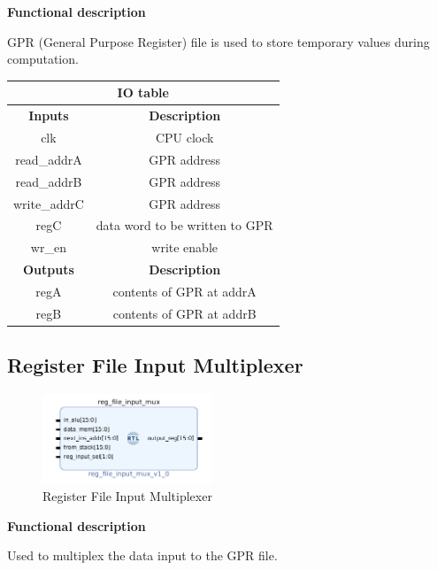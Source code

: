 \documentclass{article}
\begin{document}
\begin{par}
	\textbf{Functional description}
	\begin{par}
		GPR (General Purpose Register) file is used to store temporary values during computation.
	\end{par} 
	
	\begin{center}
		\begin{tabular}{|c|c|}
			\hline 
			\multicolumn{2}{|c|}{\textbf{IO table}} \\
			\hline 
			\textbf{Inputs} & \textbf{Description} \\ 
			\hline 
			clk & CPU clock \\ 
			\hline 
			read\_addrA & GPR address \\ 
			\hline 
			read\_addrB & GPR address \\ 
			\hline 
			write\_addrC & GPR address \\ 
			\hline 
			regC & data word to be written to GPR \\ 
			\hline 
			wr\_en & write enable \\ 
			\hline 
			\textbf{Outputs} & \textbf{Description} \\ 
			\hline 
			regA & contents of GPR at addrA \\
			\hline
			regB & contents of GPR at addrB \\
			\hline
		\end{tabular}
	\end{center}

	\newpage
	
	\subsection{Register File Input Multiplexer}
	
	\begin{figure}[H]
		\centering
		\includegraphics[width=2in]{img/regFileMux.png}
		\caption{Register File Input Multiplexer}
	\end{figure}
	
	\textbf{Functional description}
	\begin{par}
		Used to multiplex the data input to the GPR file. 
	\end{par}
	

\end{par}
\end{document}
